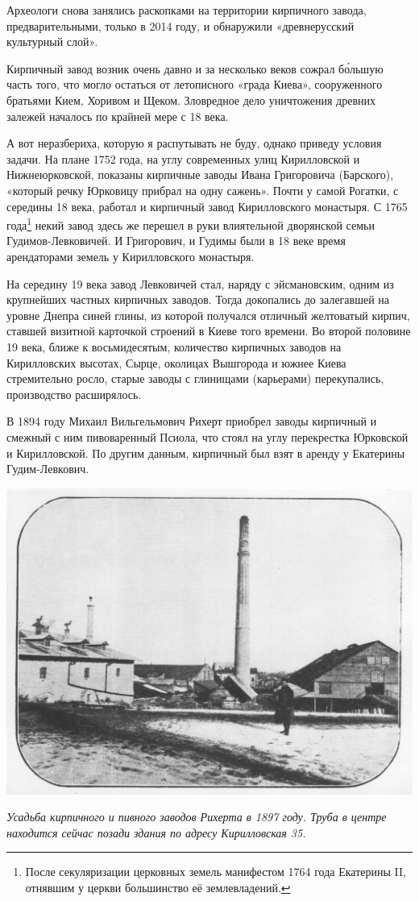 Археологи снова занялись раскопками на территории кирпичного завода, предварительными, только в 2014 году, и обнаружили «древнерусский культурный слой».

Кирпичный завод возник очень давно и за несколько веков сожрал б\'ольшую часть того, что могло остаться от летописного «града Киева», сооруженного братьями Кием, Хоривом и Щеком. Зловредное дело уничтожения древних залежей началось по крайней мере с 18 века.

А вот неразбериха, которую я распутывать не буду, однако приведу условия задачи. На плане 1752 года, на углу современных улиц Кирилловской и Нижнеюрковской, показаны кирпичные заводы Ивана Григоровича (Барского), «который речку Юрковицу прибрал на одну сажень». Почти у самой Рогатки, с середины 18 века, работал и кирпичный завод Кирилловского монастыря. С 1765 года\footnote{После секуляризации церковных земель манифестом 1764 года Екатерины II, отнявшим у церкви большинство её землевладений.} некий завод здесь же перешел в руки влиятельной дворянской семьи Гудимов-Левковичей. И Григорович, и Гудимы были в 18 веке время арендаторами земель у Кирилловского монастыря.

На середину 19 века завод Левковичей стал, наряду с эйсмановским, одним из крупнейших частных кирпичных заводов. Тогда докопались до залегавшей на уровне Днепра синей глины, из которой получался отличный желтоватый кирпич, ставшей визитной карточкой строений в Киеве того времени. Во второй половине 19 века, ближе к восьмидесятым, количество кирпичных заводов на Кирилловских высотах, Сырце, околицах Вышгорода и южнее Киева стремительно росло, старые заводы с глинищами (карьерами) перекупались, производство расширялось.

В 1894 году Михаил Вильгельмович Рихерт приобрел заводы кирпичный и смежный с ним пивоваренный Псиола, что стоял на углу перекрестка Юрковской и Кирилловской. По другим данным, кирпичный был взят в аренду у Екатерины Гудим-Левкович.

\begin{center}
\includegraphics[width=\linewidth]{chast-kirvys/lys02/1897-rihert-kirp.jpg}

\textit{Усадьба кирпичного и пивного заводов Рихерта в 1897 году. Труба в центре находится сейчас позади здания по адресу Кирилловская 35.}
\end{center}

